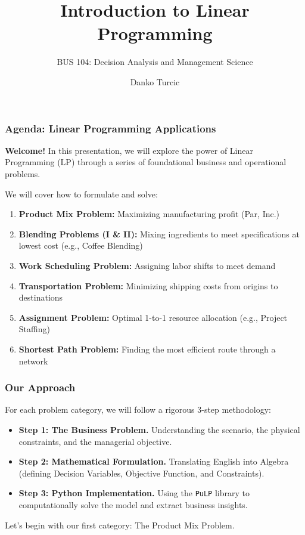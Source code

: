 \documentclass{beamer}
\title{Introduction to Linear Programming}
\subtitle{BUS 104: Decision Analysis and Management Science}
\author{Danko Turcic}
\begin{document}
\begin{frame}
  \maketitle
\end{frame}


\begin{frame}
\frametitle{Agenda: Linear Programming Applications}
\textbf{Welcome!} In this presentation, we will explore the power of Linear Programming (LP) through a series of foundational business and operational problems. 

\vspace{0.3cm}
We will cover how to formulate and solve:
\begin{enumerate}
    \item \textbf{Product Mix Problem:} Maximizing manufacturing profit (Par, Inc.)
    \item \textbf{Blending Problems (I \& II):} Mixing ingredients to meet specifications at lowest cost (e.g., Coffee Blending)
    \item \textbf{Work Scheduling Problem:} Assigning labor shifts to meet demand
    \item \textbf{Transportation Problem:} Minimizing shipping costs from origins to destinations
    \item \textbf{Assignment Problem:} Optimal 1-to-1 resource allocation (e.g., Project Staffing)
    \item \textbf{Shortest Path Problem:} Finding the most efficient route through a network
\end{enumerate}
\end{frame}

\begin{frame}
\frametitle{Our Approach}
For each problem category, we will follow a rigorous 3-step methodology:
\vspace{0.5cm}
\begin{itemize}
    \item \textbf{Step 1: The Business Problem.} Understanding the scenario, the physical constraints, and the managerial objective.
    \item \textbf{Step 2: Mathematical Formulation.} Translating English into Algebra (defining Decision Variables, Objective Function, and Constraints).
    \item \textbf{Step 3: Python Implementation.} Using the \texttt{PuLP} library to computationally solve the model and extract business insights.
\end{itemize}
\vspace{0.5cm}
Let's begin with our first category: The Product Mix Problem.
\end{frame}
\end{document}
